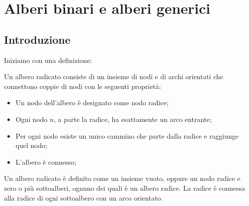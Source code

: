 \chapter{Alberi binari e alberi generici}
\section{Introduzione}
Iniziamo con una definizione:
\begin{definition}
    Un albero radicato consiste di un insieme di nodi e di archi orientati che
    connettono coppie di nodi con le seguenti proprietà:
    \begin{itemize}
        \item Un nodo dell'albero è designato come nodo radice;
        \item Ogni nodo $n$, a parte la radice, ha esattamente un arco entrante;
        \item Per ogni nodo esiste un unico cammino che parte dalla radice e
        raggiunge quel nodo;
        \item L'albero è connesso;
    \end{itemize}
\end{definition}
\begin{definition}
    Un albero radicato è definito come un insieme vuoto, oppure un nodo radice
    e zero o più sottoalberi, ognuno dei quali è un albero radice. La radice è
    connessa alla radice di ogni sottoalbero con un arco orientato.
\end{definition}

